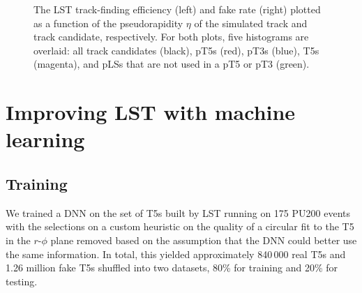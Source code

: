 \begin{figure}[!htb]
    \centering
    \qquad
    \caption[LST track-finding efficiency and fake rate plotted as a function of $\eta$]{
        The LST track-finding efficiency (left) and fake rate (right) plotted as a function of the pseudorapidity $\eta$ of the simulated track and track candidate, respectively.
        For both plots, five histograms are overlaid: all track candidates (black), pT5s (red), pT3s (blue), T5s (magenta), and pLSs that are not used in a pT5 or pT3 (green).
    }
    \label{fig:lst_performance}
\end{figure}

\section{Improving LST with machine learning}

\subsection{Training}
We trained a DNN on the set of T5s built by LST running on 175 \ttbar PU200 events with the selections on a custom heuristic on the quality of a circular fit to the T5 in the $r$-$\phi$ plane removed based on the assumption that the DNN could better use the same information. 
In total, this yielded approximately 840\,000 real T5s and 1.26 million fake T5s shuffled into two datasets, 80\% for training and 20\% for testing. 

